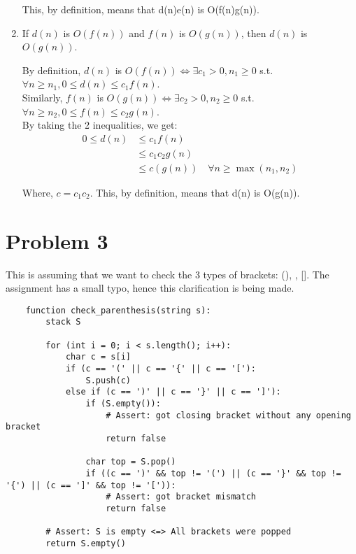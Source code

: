 \documentclass{cs1204}
\begin{document}
\begin{enumerate}
    This, by definition, means that d(n)e(n) is O(f(n)g(n)).

    \vspace{4.5mm}
    \item If $d(n)$ is $O(f(n))$ and $f(n)$ is $O(g(n))$, then $d(n)$ is $O(g(n))$.

    By definition, $d(n)$ is $O(f(n)) \iff \exists c_1 > 0, n_1 \geq 0$ s.t. $\forall n \geq n_1, 0 \leq d(n) \leq c_1f(n)$.\\
    Similarly, $f(n)$ is $O(g(n)) \iff \exists c_2 > 0, n_2 \geq 0$ s.t. $\forall n \geq n_2, 0 \leq f(n) \leq c_2g(n)$.\\

    By taking the 2 inequalities, we get:
    \begin{align*}
        0 \leq d(n) &\leq c_1f(n)\\
        &\leq c_1c_2g(n)\\
        &\leq c(g(n)) \quad \forall n \geq \max(n_1, n_2)
    \end{align*}

    Where, $c = c_1c_2$. This, by definition, means that d(n) is O(g(n)).
\end{enumerate}


\newpage
\section*{Problem 3}
This is assuming that we want to check the 3 types of brackets: (), {}, []. The assignment has a small typo, hence this clarification is being made.

\begin{verbatim}
    function check_parenthesis(string s):
        stack S

        for (int i = 0; i < s.length(); i++):
            char c = s[i]
            if (c == '(' || c == '{' || c == '['):
                S.push(c)
            else if (c == ')' || c == '}' || c == ']'):
                if (S.empty()):
                    # Assert: got closing bracket without any opening bracket
                    return false

                char top = S.pop()
                if ((c == ')' && top != '(') || (c == '}' && top != '{') || (c == ']' && top != '[')):
                    # Assert: got bracket mismatch
                    return false

        # Assert: S is empty <=> All brackets were popped
        return S.empty()
\end{verbatim}
\end{document}
